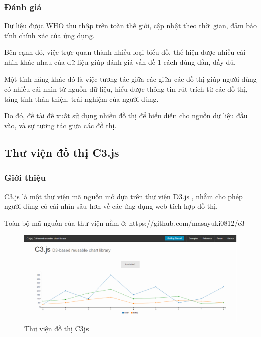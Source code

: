 \documentclass[12pt,a4paper,oneside]{article}
\begin{document}
\subsubsection{Đánh giá}
Dữ liệu được WHO thu thập trên toàn thế giới, cập nhật theo thời gian, đảm bảo tính chính xác của ứng dụng.

Bên cạnh đó, việc trực quan thành nhiều loại biểu đồ, thể hiện được nhiều cái nhìn khác nhau của dữ liệu giúp đánh giá vấn đề 1 cách đúng đắn, đầy đủ.

Một tính năng khác đó là việc tương tác giữa các giữa các đồ thị giúp người dùng có nhiều cái nhìn từ nguồn dữ liệu, hiểu được thông tin rút trích từ các đồ thị, tăng tính thân thiện, trải nghiệm của người dùng.

Do đó, đề tài đề xuất sử dụng nhiều đồ thị để biểu diễn cho nguồn dữ liệu đầu vào, và sự tương tác giữa các đồ thị.

\subsection{Thư viện đồ thị C3.js}
\subsubsection{Giới thiệu}
C3.js là một thư viện mã nguồn mở \cite{c3js} dựa trên thư viện D3.js , nhằm cho phép người dùng có cái nhìn sâu hơn về các ứng dụng web tích hợp đồ thị.

Toàn bộ mã nguồn của thư viện nằm ở: https://github.com/masayuki0812/c3
\begin{figure}[htp]
    \includegraphics[scale=.4]{image/c3js}
    \caption{Thư viện đồ thị C3js}
    \label{refhinh5}
\end{figure}
\end{document}
